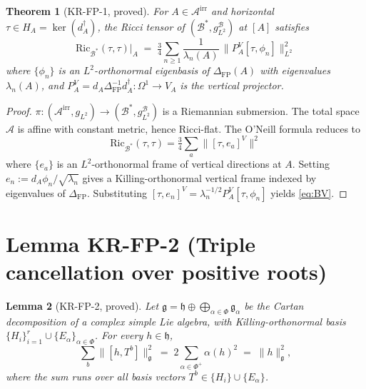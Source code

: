 \documentclass[11pt]{article}
\newtheorem{theorem}{Theorem}
\newtheorem{lemma}[theorem]{Lemma}
\begin{document}
\begin{theorem}[KR-FP-1, proved]\label{thm:KR-FP-1}
For $A\in\mathcal{A}^{\mathrm{irr}}$ and horizontal $\tau\in H_A=\ker(d_A^\dagger)$, the Ricci tensor of $(\mathcal{B}^*,g_{L^2}^\mathcal{B})$ at $[A]$ satisfies
\begin{equation}
\mathrm{Ric}_{\mathcal{B}^*}(\tau,\tau)\big|_A \;=\; \tfrac{3}{4}\sum_{n\geq 1}\frac{1}{\lambda_n(A)}\,\big\|P^V_A[\tau,\phi_n]\big\|^2_{L^2}\label{eq:BV}
\end{equation}
where $\{\phi_n\}$ is an $L^2$-orthonormal eigenbasis of $\Delta_{\mathrm{FP}}(A)$ with eigenvalues $\lambda_n(A)$, and $P^V_A=d_A\Delta_{\mathrm{FP}}^{-1}d_A^\dagger:\Omega^1\to V_A$ is the vertical projector.
\end{theorem}

\begin{proof}
$\pi:(\mathcal{A}^{\mathrm{irr}},g_{L^2})\to(\mathcal{B}^*,g_{L^2}^\mathcal{B})$ is a Riemannian submersion. The total space $\mathcal{A}$ is affine with constant metric, hence Ricci-flat. The O'Neill formula reduces to
\[
\mathrm{Ric}_{\mathcal{B}^*}(\tau,\tau)=\tfrac{3}{4}\sum_{a}\|[\tau,e_a]^V\|^2
\]
where $\{e_a\}$ is an $L^2$-orthonormal frame of vertical directions at $A$. Setting $e_n:=d_A\phi_n/\sqrt{\lambda_n}$ gives a Killing-orthonormal vertical frame indexed by eigenvalues of $\Delta_{\mathrm{FP}}$. Substituting $[\tau,e_n]^V=\lambda_n^{-1/2}P^V_A[\tau,\phi_n]$ yields \eqref{eq:BV}.
\end{proof}

\section{Lemma KR-FP-2 (Triple cancellation over positive roots)}

\begin{lemma}[KR-FP-2, proved]\label{lem:KR-FP-2}
Let $\mathfrak{g}=\mathfrak{h}\oplus\bigoplus_{\alpha\in\Phi}\mathfrak{g}_\alpha$ be the Cartan decomposition of a complex simple Lie algebra, with Killing-orthonormal basis $\{H_i\}_{i=1}^r\cup\{E_\alpha\}_{\alpha\in\Phi}$. For every $h\in\mathfrak{h}$,
\begin{equation}
\sum_b\|[h,T^b]\|_{\mathfrak{g}}^2 \;=\; 2\!\!\sum_{\alpha\in\Phi^+}\!\!\alpha(h)^2 \;=\; \|h\|^2_{\mathfrak{g}}, \label{eq:triplecancel}
\end{equation}
where the sum runs over all basis vectors $T^b\in\{H_i\}\cup\{E_\alpha\}$.
\end{lemma}
\end{document}
